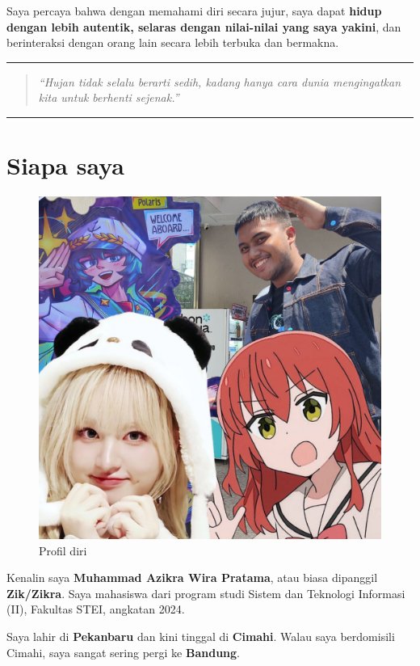 \documentclass[
  letterpaper,
  DIV=11,
  numbers=noendperiod]{scrreprt}
\begin{document}
Saya percaya bahwa dengan memahami diri secara jujur, saya dapat
\textbf{hidup dengan lebih autentik, selaras dengan nilai-nilai yang
saya yakini}, dan berinteraksi dengan orang lain secara lebih terbuka
dan bermakna.

\begin{center}\rule{0.5\linewidth}{0.5pt}\end{center}

\begin{quote}
\emph{``Hujan tidak selalu berarti sedih, kadang hanya cara dunia
mengingatkan kita untuk berhenti sejenak.''}
\end{quote}

\begin{center}\rule{0.5\linewidth}{0.5pt}\end{center}

\section{Siapa saya}\label{siapa-saya}

\begin{figure}[H]

{\centering \includegraphics[width=0.6\linewidth,height=\textheight,keepaspectratio]{All_about_me/../images/Identitas.png}

}

\caption{Profil diri}

\end{figure}%

Kenalin saya \textbf{Muhammad Azikra Wira Pratama}, atau biasa dipanggil
\textbf{Zik/Zikra}. Saya mahasiswa dari program studi Sistem dan
Teknologi Informasi (II), Fakultas STEI, angkatan 2024.

Saya lahir di \textbf{Pekanbaru} dan kini tinggal di \textbf{Cimahi}.
Walau saya berdomisili Cimahi, saya sangat sering pergi ke
\textbf{Bandung}.
\end{document}
